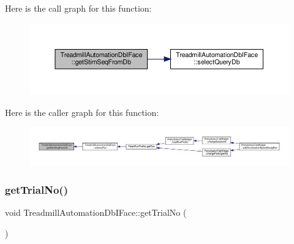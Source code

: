 Here is the call graph for this function\+:
\nopagebreak
\begin{figure}[H]
\begin{center}
\leavevmode
\includegraphics[width=350pt]{class_treadmill_automation_db_i_face_a97a851c99b7ca8ee21a908d768168052_cgraph}
\end{center}
\end{figure}
Here is the caller graph for this function\+:
\nopagebreak
\begin{figure}[H]
\begin{center}
\leavevmode
\includegraphics[width=350pt]{class_treadmill_automation_db_i_face_a97a851c99b7ca8ee21a908d768168052_icgraph}
\end{center}
\end{figure}
\mbox{\label{class_treadmill_automation_db_i_face_aebab4cc02e56ef36085545b20ac3c021}} 
\subsubsection{\texorpdfstring{get\+Trial\+No()}{getTrialNo()}}
{\footnotesize\ttfamily void Treadmill\+Automation\+Db\+I\+Face\+::get\+Trial\+No (\begin{DoxyParamCaption}{ }\end{DoxyParamCaption})}

\mbox{\label{class_treadmill_automation_db_i_face_a1f463b6be4cdd09d55df207572407822}} 
